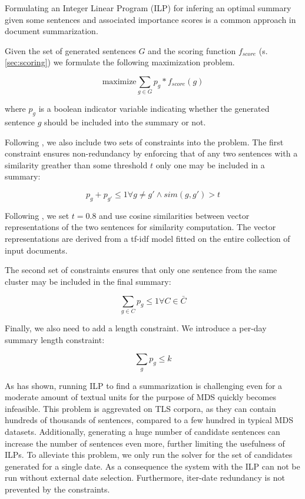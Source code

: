 \documentclass[a4paper,BCOR=10mm]{report}
\begin{document}
Formulating an Integer Linear Program (ILP) for infering an optimal summary given some sentences and associated importance scores is a common approach in document summarization. %

Given the set of generated sentences $G$ and the scoring function $f_{score}$ (s. \ref{sec:scoring}) we formulate the following maximization problem.

\begin{displaymath}
\text{maximize} \sum_{g \in G} p_g * f_{score}(g)
\end{displaymath}

where $p_g$ is a boolean indicator variable indicating whether the generated sentence $g$ should be included into the summary or not.

Following \citet{banerjee}, we also include two sets of constraints into the problem.
The first constraint ensures non-redundancy by enforcing that of any two sentences with a similarity greather than some threshold $t$ only one may be included in a summary:

\begin{displaymath}
p_g + p_{g'} \leq 1 \forall g \neq g' \land sim(g, g') > t
\end{displaymath}

Following \citet{banerjee}, we set $t = 0.8$ and use cosine similarities between vector representations of the two sentences for similarity computation.
The vector representations are derived from a tf-idf model fitted on the entire collection of input documents.

The second set of constraints ensures that only one sentence from the same cluster may be included in the final summary:

\begin{displaymath}
\sum_{g \in C} p_g \leq 1 \forall C \in \bar{C}
\end{displaymath}

Finally, we also need to add a length constraint. We introduce a per-day summary length constraint:

\begin{displaymath}
\sum_{g} p_g \leq k
\end{displaymath}


As \citet{mcdonald} has shown, running ILP to find a summarization is challenging even for a moderate amount of textual units for the purpose of MDS quickly becomes infeasible.
This problem is aggrevated on TLS corpora, as they can contain hundreds of thousands of sentences, compared to a few hundred in typical MDS datasets. Additionally, generating a huge number of candidate sentences can increase the number of sentences even more, further limiting the usefulness of ILPs.
To alleviate this problem, we only run the solver for the set of candidates generated for a single date. As a consequence the system with the ILP can not be run without external date selection. Furthermore, iter-date redundancy is not prevented by the constraints.
\end{document}

